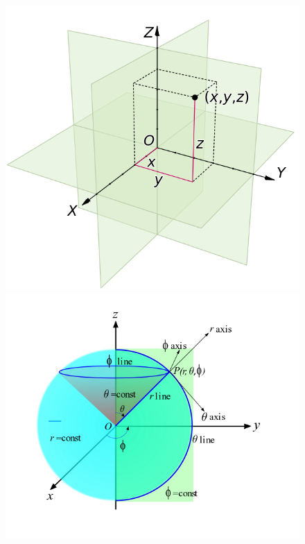 \documentclass{book}
\theoremstyle{definition}
\begin{document}
\begin{figure}[h!]
	\centering
	\includegraphics[scale=0.2]{gr-fig-4a.png}
	\includegraphics[scale=0.25]{gr-fig-4b.png}

\end{figure}
\end{document}
